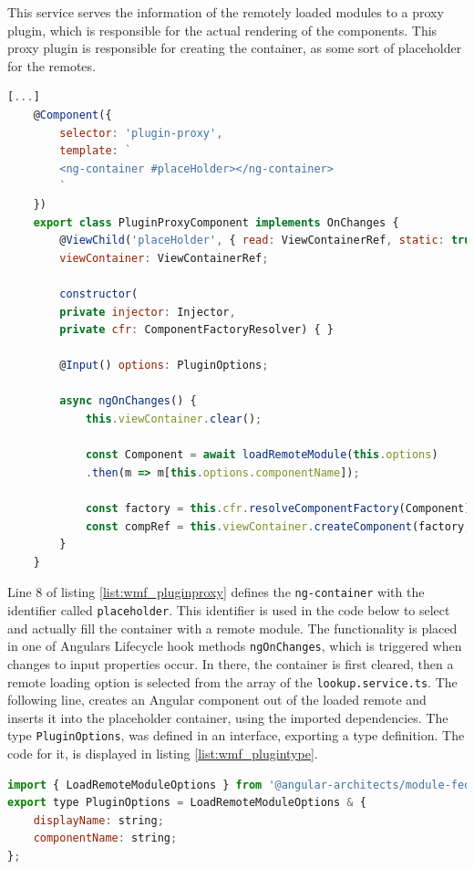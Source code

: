 This service serves the information of the remotely loaded modules to a proxy plugin, which is responsible for the actual rendering of the components. This proxy plugin is responsible for creating the container, as some sort of placeholder for the remotes. \cite{wmf_angular_dynamicfederation}
\newpage
\begin{lstlisting}[language=JavaScript, caption=Content of \texttt{plugin-proxy.component.ts} for remote module loading in shell applications, label=list:wmf_pluginproxy,  xleftmargin=.0\textwidth, xrightmargin=.0\textwidth]
	[...]	
	@Component({
		selector: 'plugin-proxy',
		template: `
		<ng-container #placeHolder></ng-container>
		`
	})
	export class PluginProxyComponent implements OnChanges {
		@ViewChild('placeHolder', { read: ViewContainerRef, static: true })
		viewContainer: ViewContainerRef;
		
		constructor(
		private injector: Injector,
		private cfr: ComponentFactoryResolver) { }
		
		@Input() options: PluginOptions;
		
		async ngOnChanges() {
			this.viewContainer.clear();
			
			const Component = await loadRemoteModule(this.options)
			.then(m => m[this.options.componentName]);
			
			const factory = this.cfr.resolveComponentFactory(Component);
			const compRef = this.viewContainer.createComponent(factory, null, this.injector);		
		}
	}
\end{lstlisting}

Line 8 of listing \ref{list:wmf_pluginproxy} defines the \texttt{ng-container} with the identifier called \texttt{placeholder}. This identifier is used in the code below to select and actually fill the container with a remote module. The functionality is placed in one of Angulars Lifecycle hook methods \texttt{ngOnChanges}, which is triggered when changes to input properties occur.\cite{wmf_angular_lifecyclehooks} 
In there, the container is first cleared, then a remote loading option is selected from the array of the \texttt{lookup.service.ts}. The following line, creates an Angular component out of the loaded remote and inserts it into the placeholder container, using the imported dependencies.
The type \texttt{PluginOptions}, was defined in an interface, exporting a type definition. The code for it, is displayed in listing \ref{list:wmf_plugintype}.
\newpage
\begin{lstlisting}[language=JavaScript, caption=Content of \texttt{plugin.ts} for remote module loading in shell applications, label=list:wmf_plugintype,  xleftmargin=.0\textwidth, xrightmargin=.0\textwidth]
import { LoadRemoteModuleOptions } from '@angular-architects/module-federation';
export type PluginOptions = LoadRemoteModuleOptions & {
	displayName: string;
	componentName: string;
};
\end{lstlisting}

